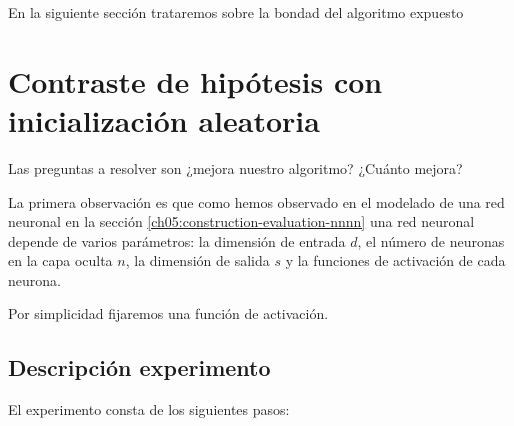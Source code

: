 
En la siguiente sección trataremos sobre la bondad del algoritmo expuesto

\section{Contraste de hipótesis con inicialización aleatoria} 
\label{ch07:experimento-1} 

Las preguntas a resolver son ¿mejora nuestro algoritmo? ¿Cuánto mejora?

La primera observación  es que como
hemos observado en el modelado de una red neuronal 
en la sección \ref{ch05:construction-evaluation-nnnn}
una red neuronal depende de varios parámetros:
la dimensión de entrada $d$, el número de neuronas en la capa oculta $n$, la dimensión de salida $s$ 
y la funciones de activación de cada neurona.  

Por simplicidad fijaremos una función de activación. 


\subsection{Descripción experimento}

El experimento consta de los siguientes pasos: 

